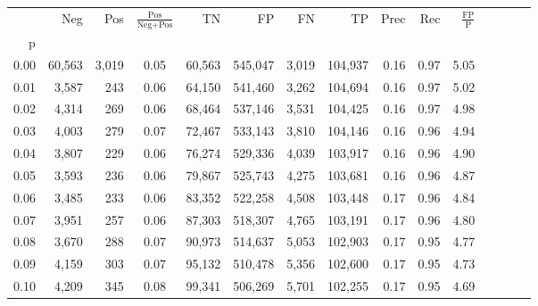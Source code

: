 \begin{tabular}{rrrcrrrrrrrrrrr}
\toprule
{} &     Neg &     Pos & $\frac{\text{Pos}}{\text{Neg}+\text{Pos}}$ &       TN &       FP &       FN &       TP &  Prec &   Rec & $\frac{\text{FP}}{\text{P}}$ \\
p    &         &         &                                            &          &          &          &          &       &       &                              \\
\midrule
0.00 &  60,563 &   3,019 &                                       0.05 &   60,563 &  545,047 &    3,019 &  104,937 &  0.16 &  0.97 &                         5.05 \\
0.01 &   3,587 &     243 &                                       0.06 &   64,150 &  541,460 &    3,262 &  104,694 &  0.16 &  0.97 &                         5.02 \\
0.02 &   4,314 &     269 &                                       0.06 &   68,464 &  537,146 &    3,531 &  104,425 &  0.16 &  0.97 &                         4.98 \\
0.03 &   4,003 &     279 &                                       0.07 &   72,467 &  533,143 &    3,810 &  104,146 &  0.16 &  0.96 &                         4.94 \\
0.04 &   3,807 &     229 &                                       0.06 &   76,274 &  529,336 &    4,039 &  103,917 &  0.16 &  0.96 &                         4.90 \\
0.05 &   3,593 &     236 &                                       0.06 &   79,867 &  525,743 &    4,275 &  103,681 &  0.16 &  0.96 &                         4.87 \\
0.06 &   3,485 &     233 &                                       0.06 &   83,352 &  522,258 &    4,508 &  103,448 &  0.17 &  0.96 &                         4.84 \\
0.07 &   3,951 &     257 &                                       0.06 &   87,303 &  518,307 &    4,765 &  103,191 &  0.17 &  0.96 &                         4.80 \\
0.08 &   3,670 &     288 &                                       0.07 &   90,973 &  514,637 &    5,053 &  102,903 &  0.17 &  0.95 &                         4.77 \\
0.09 &   4,159 &     303 &                                       0.07 &   95,132 &  510,478 &    5,356 &  102,600 &  0.17 &  0.95 &                         4.73 \\
0.10 &   4,209 &     345 &                                       0.08 &   99,341 &  506,269 &    5,701 &  102,255 &  0.17 &  0.95 &                         4.69 \\

\end{tabular}
